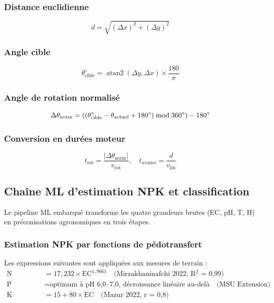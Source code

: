 \documentclass[a4paper,12pt,openany,titlepage]{scrartcl}
\begin{document}
\subsubsection{Distance euclidienne}
\begin{equation}
d = \sqrt{(\Delta x)^2 + (\Delta y)^2}
\end{equation}

\subsubsection{Angle cible}
\begin{equation}
\theta_{\text{cible}}^{\circ} = \operatorname{atan2}(\Delta y, \Delta x) \times \frac{180}{\pi}
\end{equation}

\subsubsection{Angle de rotation normalisé}
\begin{equation}
\Delta\theta_{\text{norm}} = ((\theta_{\text{cible}}^{\circ} - \theta_{\text{actuel}} + 180\degree) \bmod 360\degree) - 180\degree
\end{equation}

\subsubsection{Conversion en durées moteur}
\begin{equation}
t_{\text{rot}} = \frac{|\Delta\theta_{\text{norm}}|}{v_{\text{rot}}}, \quad t_{\text{avance}} = \frac{d}{v_{\text{lin}}}
\end{equation}

\subsection{Chaîne ML d’estimation NPK et classification}

Le pipeline ML embarqué transforme les quatre grandeurs brutes (EC, pH, T, H) en préconisations agronomiques en trois étapes.

\subsubsection{Estimation NPK par fonctions de pédotransfert}
Les expressions suivantes sont appliquées aux mesures de terrain :
\begin{align}
\text{N (mg/kg)} &= 17{,}232 \times \text{EC}^{1{,}9661} \quad \text{(Mirzakhaninafchi 2022, R$^2$ = 0,99)} \\
\text{P (mg/kg)} &= \text{optimum à pH 6,0--7,0, décroissance linéaire au-delà} \quad \text{(MSU Extension)} \\
\text{K (mg/kg)} &= 15 + 80 \times \text{EC} \quad \text{(Mazur 2022, r = 0,8)}
\end{align}
\end{document}
